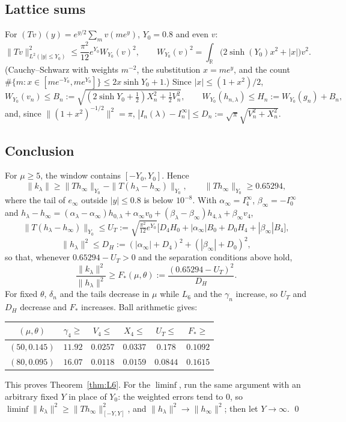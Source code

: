 \documentclass[11pt]{amsart}
\theoremstyle{remark}
\numberwithin{equation}{section}
\newcommand{\R}{\mathbb{R}}
\begin{document}
\subsection{Lattice sums}
For $(Tv)(y)=e^{y/2}\sum_mv(me^y)$, $Y_0=0.8$ and even $v$:
\[
\|Tv\|^2_{L^2(|y|\le Y_0)}\le\frac{\pi^2}{12}e^{Y_0}W_{Y_0}(v)^2,\qquad W_{Y_0}(v)^2=\int_\R\big(2\sinh(Y_0)x^2+|x|\big)v^2 .
\]
(Cauchy--Schwarz with weights $m^{-2}$, the substitution $x=me^y$, and the count $\#\{m:x\in[me^{-Y_0},me^{Y_0}]\}\le2x\sinh Y_0+1$.) Since $|x|\le(1+x^2)/2$,
\[
W_{Y_0}(v_n)\le B_n:=\sqrt{(2\sinh Y_0+\tfrac12)X_n^2+\tfrac12V_n^2},\qquad W_{Y_0}(h_{n,\lambda})\le H_n:=W_{Y_0}(g_n)+B_n,
\]
and, since $\|(1+x^2)^{-1/2}\|^2=\pi$, $|I_n(\lambda)-I_n^\infty|\le D_n:=\sqrt\pi\sqrt{V_n^2+X_n^2}$.

\subsection{Conclusion}
For $\mu\ge5$, the window contains $[-Y_0,Y_0]$. Hence
\[
\|k_\lambda\|\ge\|Th_\infty\|_{Y_0}-\|T(h_\lambda-h_\infty)\|_{Y_0},\qquad\|Th_\infty\|_{Y_0}\ge0.65294,
\]
where the tail of $e_\infty$ outside $|y|\le0.8$ is below $10^{-8}$. With $\alpha_\infty=I_4^\infty$, $\beta_\infty=-I_0^\infty$ and $h_\lambda-h_\infty=(\alpha_\lambda-\alpha_\infty)h_{0,\lambda}+\alpha_\infty v_0+(\beta_\lambda-\beta_\infty)h_{4,\lambda}+\beta_\infty v_4$,
\[
\|T(h_\lambda-h_\infty)\|_{Y_0}\le U_T:=\sqrt{\tfrac{\pi^2}{12}e^{Y_0}}\big[D_4H_0+|\alpha_\infty|B_0+D_0H_4+|\beta_\infty|B_4\big],
\]
\[
\|h_\lambda\|^2\le D_H:=(|\alpha_\infty|+D_4)^2+(|\beta_\infty|+D_0)^2,
\]
so that, whenever $0.65294-U_T>0$ and the separation conditions above hold,
\[
\frac{\|k_\lambda\|^2}{\|h_\lambda\|^2}\ge F_*(\mu,\theta):=\frac{(0.65294-U_T)^2}{D_H}.
\]
For fixed $\theta$, $\delta_n$ and the tails decrease in $\mu$ while $L_6$ and the $\gamma_n$ increase, so $U_T$ and $D_H$ decrease and $F_*$ increases. Ball arithmetic gives:

\begin{center}
\begin{tabular}{cccccc}
\toprule
$(\mu,\theta)$ & $\gamma_4\ge$ & $V_4\le$ & $X_4\le$ & $U_T\le$ & $F_*\ge$\\
\midrule
$(50,0.145)$ & $11.92$ & $0.0257$ & $0.0337$ & $0.178$ & $0.1092$\\
$(80,0.095)$ & $16.07$ & $0.0118$ & $0.0159$ & $0.0844$ & $0.1615$\\
\bottomrule
\end{tabular}
\end{center}
This proves Theorem~\ref{thm:L6}. For the $\liminf$, run the same argument with an arbitrary fixed $Y$ in place of $Y_0$: the weighted errors tend to $0$, so $\liminf\|k_\lambda\|^2\ge\|Th_\infty\|^2_{[-Y,Y]}$, and $\|h_\lambda\|^2\to\|h_\infty\|^2$; then let $Y\to\infty$. \qed
\end{document}
